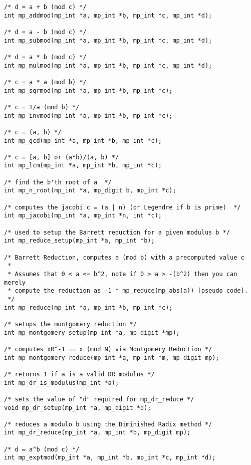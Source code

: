 \documentclass[]{article}
\begin{document}
\begin{verbatim}
/* d = a + b (mod c) */
int mp_addmod(mp_int *a, mp_int *b, mp_int *c, mp_int *d);

/* d = a - b (mod c) */
int mp_submod(mp_int *a, mp_int *b, mp_int *c, mp_int *d);

/* d = a * b (mod c) */
int mp_mulmod(mp_int *a, mp_int *b, mp_int *c, mp_int *d);

/* c = a * a (mod b) */
int mp_sqrmod(mp_int *a, mp_int *b, mp_int *c);

/* c = 1/a (mod b) */
int mp_invmod(mp_int *a, mp_int *b, mp_int *c);

/* c = (a, b) */
int mp_gcd(mp_int *a, mp_int *b, mp_int *c);

/* c = [a, b] or (a*b)/(a, b) */
int mp_lcm(mp_int *a, mp_int *b, mp_int *c);

/* find the b'th root of a  */
int mp_n_root(mp_int *a, mp_digit b, mp_int *c);

/* computes the jacobi c = (a | n) (or Legendre if b is prime)  */
int mp_jacobi(mp_int *a, mp_int *n, int *c);

/* used to setup the Barrett reduction for a given modulus b */
int mp_reduce_setup(mp_int *a, mp_int *b);

/* Barrett Reduction, computes a (mod b) with a precomputed value c  
 *
 * Assumes that 0 < a <= b^2, note if 0 > a > -(b^2) then you can merely
 * compute the reduction as -1 * mp_reduce(mp_abs(a)) [pseudo code].
 */
int mp_reduce(mp_int *a, mp_int *b, mp_int *c);

/* setups the montgomery reduction */
int mp_montgomery_setup(mp_int *a, mp_digit *mp);

/* computes xR^-1 == x (mod N) via Montgomery Reduction */
int mp_montgomery_reduce(mp_int *a, mp_int *m, mp_digit mp);

/* returns 1 if a is a valid DR modulus */
int mp_dr_is_modulus(mp_int *a);

/* sets the value of "d" required for mp_dr_reduce */
void mp_dr_setup(mp_int *a, mp_digit *d);

/* reduces a modulo b using the Diminished Radix method */
int mp_dr_reduce(mp_int *a, mp_int *b, mp_digit mp);

/* d = a^b (mod c) */
int mp_exptmod(mp_int *a, mp_int *b, mp_int *c, mp_int *d);
\end{verbatim}
\end{document}

